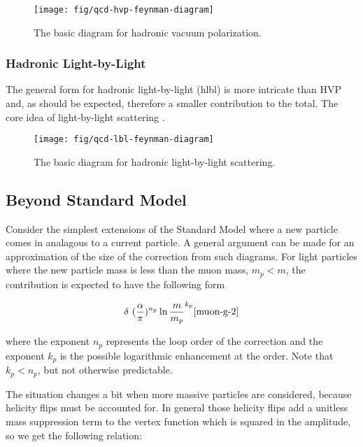 \begin{figure}
\label{fig:qcd-hvp-feynman-diagram}
\texttt{[image: fig/qcd-hvp-feynman-diagram]}
\caption{The basic diagram for hadronic vacuum polarization.}
\end{figure}


\subsubsection{Hadronic Light-by-Light}

The general form for hadronic light-by-light (hlbl) is more intricate than HVP and, as should be expected, therefore a smaller contribution to the total.  The core idea of light-by-light scattering .

\begin{figure}
\label{fig:qcd-lbl-feynman-diagram}
\texttt{[image: fig/qcd-lbl-feynman-diagram]}
\caption{The basic diagram for hadronic light-by-light scattering.}
\end{figure}

\subsection{Beyond Standard Model}

Consider the simplest extensions of the Standard Model where a new particle comes in analagous to a current particle.  A general argument can be made for an approximation of the size of the correction from such diagrams.  For light particles where the new particle mass is less than the muon mass, $m_p < m$, the contribution is expected to have the following form

\begin{equation}
\label{eqn:bsm-general-small-m}
\delta ~ (\frac{\alpha}{\pi})^{n_p} \ln{\frac{m}{m_p}}^{k_p} \ref{muon-g-2}
\end{equation}

where the exponent $n_p$ represents the loop order of the correction  and the exponent $k_p$ is the possible logarithmic enhancement at the order.  Note that $k_p < n_p$, but not otherwise predictable.

The situation changes a bit when more massive particles are considered, because helicity flips must be accounted for.  In general those helicity flips add a unitless mass suppression term to the vertex function which is squared in the amplitude, so we get the following relation:

